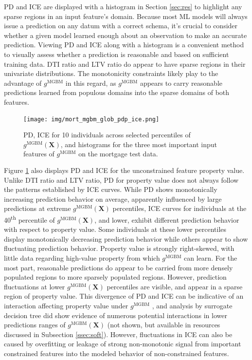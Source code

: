 \documentclass[information,article,submit,moreauthors,pdftex]{definitions/mdpi}
\begin{document}
PD and ICE are displayed with a histogram in Section \ref{sec:res} to highlight any sparse regions in an input feature's domain. Because most ML models will always issue a prediction on any datum with a correct schema, it's crucial to consider whether a given model learned enough about an observation to make an accurate prediction. Viewing PD and ICE along with a histogram is a convenient method to visually assess whether a prediction is reasonable and based on sufficient training data. DTI ratio and LTV ratio do appear to have sparse regions in their univariate distributions. The monotonicity constraints likely play to the advantage of $g^\text{MGBM}$ in this regard, as $g^\text{MGBM}$ appears to carry reasonable predictions learned from populous domains into the sparse domains of both features. 

\begin{figure}[htb]
\hskip-10pt\texttt{[image: img/mort\_mgbm\_glob\_pdp\_ice.png]}
\caption{PD, ICE for 10 individuals across selected percentiles of $g^\text{MGBM}(\mathbf{X})$, and histograms for the three most important input features of $g^\text{MGBM}$ on the mortgage test data.}
\label{fig:mort_mgbm_glob_pdp_ice}
\end{figure}   

Figure \ref{fig:mort_mgbm_glob_pdp_ice} also displays PD and ICE for the unconstrained feature property value. Unlike DTI ratio and LTV ratio, PD for property value does not always follow the patterns established by ICE curves. While PD shows monotonically increasing prediction behavior on average, apparently influenced by large predictions at extreme $g^{\text{MGBM}}(\mathbf{X})$ percentiles, ICE curves for individuals at the 40\textsuperscript{th} percentile of $g^{\text{MGBM}}(\mathbf{X})$, and lower, exhibit different prediction behavior with respect to property value. Some individuals at these lower percentiles display monotonically decreasing prediction behavior while others appear to show fluctuating prediction behavior. Property value is strongly right-skewed, with little data regarding high-value property from which $g^{\text{MGBM}}$ can learn. For the most part, reasonable predictions do appear to be carried from more densely populated regions to more sparsely populated regions. However, prediction fluctuations at lower $g^{\text{MGBM}}(\mathbf{X})$ percentiles are visible, and appear in a sparse region of property value. This divergence of PD and ICE can be indicative of an interaction affecting property value under $g^{\text{MGBM}}$ \cite{ice_plots}, and analysis by surrogate decision tree did show evidence of numerous potential interactions in lower predictions ranges of $g^{\text{MGBM}}(\mathbf{X})$ \cite{art_and_sci} (not shown, but available in resources discussed in Subsection \ref{ssec:soft}). However, fluctuations in ICE can also be caused by overfitting or leakage of strong non-monotonic signal from important constrained features into the modeled behavior of non-constrained features. 
\end{document}
